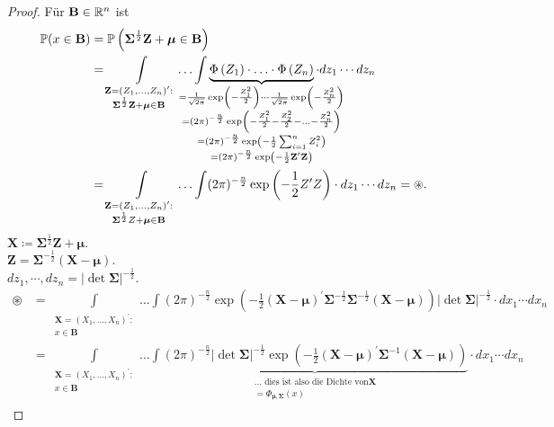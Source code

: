 \documentclass{tstextbook}
\begin{document}
\begin{proof}
	Für $ \mathbf{B} \in \mathbb R^n $ ist 
	\[ \begin{aligned}
		\Prob(x \in \mathbf{B}) & = \Prob \left( \boldsymbol{\Sigma}^{\frac{1}{2}} \mathbf{Z} + \boldsymbol{\mu} \in \mathbf{B} \right) \\
		& = \int\limits_{\substack{\mathbf{Z}=(Z_1,\ldots,Z_n)^\prime : \\ \boldsymbol{\Sigma}^{\frac{1}{2}} \mathbf{Z} + \boldsymbol{\mu} \in \mathbf{B}}} \ldots \int \underbrace{\Phi \left( Z_1\right) \cdot \ldots \cdot \Phi \left(Z_n\right)}_{\mathclap{\substack{= \frac{1}{\sqrt{2\pi}} \exp\left( {-\frac{Z_1^2}{2}}\right)  \cdots \frac{1}{\sqrt{2\pi}} \exp\left( {-\frac{Z_n^2}{2}}\right)  \\
		= (2\pi)^{-\frac{n}{2}} \exp\left( {-\frac{Z_1^2}{2}-\frac{Z_2^2}{2}-\ldots - \frac{Z_n^2}{2}}\right) \\
		= (2\pi)^{-\frac{n}{2}} \exp\left(-\frac{1}{2} \sum_{i=1}^{n} Z_i^2 \right) \\
		= (2\pi)^{-\frac{n}{2}} \exp\left(-\frac{1}{2}\mathbf{Z}^\prime \mathbf{Z} \right)  }}} \cdot dz_1 \cdots  dz_n \\
		& = \int\limits_{\substack{\mathbf{Z}=(Z_1,\ldots,Z_n)^\prime : \\ \boldsymbol{\Sigma}^{\frac{1}{2}} Z + \boldsymbol{\mu} \in \mathbf{B}}} \ldots \int (2\pi)^{-\frac{n}{2}} \exp\left(-\frac{1}{2}Z^\prime Z \right) \cdot dz_1 \cdots  dz_n = \circledast.
	\end{aligned}
	\]
	$ \mathbf{X} \coloneqq \boldsymbol{\Sigma}^{\frac{1}{2}} \mathbf{Z} + \boldsymbol{\mu}. $ \\
	$ \mathbf{Z} = \boldsymbol{\Sigma}^{-\frac{1}{2}} (\mathbf{X}-\boldsymbol{\mu}). $ \\
	$ dz_1,\cdots, dz_n = |\det\boldsymbol{\Sigma}|^{-\frac{1}{2}}. $
	\[
	\begin{aligned}
		\circledast & = \int\limits_{\substack{\mathbf{X}=(X_1,\ldots,X_n)^\prime : \\ x \in \mathbf{B}}} \ldots \int (2\pi)^{-\frac{n}{2}} \exp\left(-\frac{1}{2}(\mathbf{X}-\boldsymbol{\mu})^\prime \boldsymbol{\Sigma}^{-\frac{1}{2}} \boldsymbol{\Sigma}^{-\frac{1}{2}} (\mathbf{X}-\boldsymbol{\mu}) \right) |\det \boldsymbol{\Sigma} |^{-\frac{1}{2}}  \cdot dx_1 \cdots  dx_n \\
		& = \int\limits_{\substack{\mathbf{X}=(X_1,\ldots,X_n)^\prime : \\ x \in \mathbf{B}}} \ldots \int \underbrace{(2\pi)^{-\frac{n}{2}} |\det \boldsymbol{\Sigma} |^{-\frac{1}{2}} \exp\left(-\frac{1}{2}(\mathbf{X}-\boldsymbol{\mu})^\prime \boldsymbol{\Sigma}^{-1} (\mathbf{X}-\boldsymbol{\mu}) \right)}_{\substack{\ldots\text{ dies ist also die Dichte von} \mathbf{X} \\ = \Phi_{\boldsymbol{\mu},\boldsymbol{\Sigma}}(x)}}   \cdot dx_1 \cdots  dx_n
	\end{aligned}
	\]

\end{proof}
\end{document}
